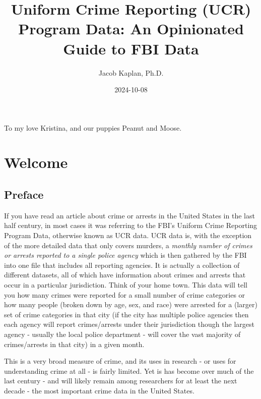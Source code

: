 \documentclass[
]{krantz}
\title{Uniform Crime Reporting (UCR) Program Data: An
Opinionated Guide to FBI Data}
\author{Jacob Kaplan, Ph.D.}
\date{2024-10-08}
\begin{document}
\maketitle

\thispagestyle{empty}
\begin{center}
To my love Kristina, and our puppies Peanut and Moose.
\end{center}

\setlength{\abovedisplayskip}{-5pt}
\setlength{\abovedisplayshortskip}{-5pt}

{
\hypersetup{linkcolor=}
\setcounter{tocdepth}{2}
\tableofcontents
}
\mainmatter

\part{Welcome}\label{part-welcome}

\chapter{Preface}\label{preface}

If you have read an article about crime or arrests in the
United States in the last half century, in most cases it was
referring to the FBI's Uniform Crime Reporting Program Data,
otherwise known as UCR data. UCR data is, with the exception
of the more detailed data that only covers murders, a
\emph{monthly number of crimes or arrests reported to a
single police agency} which is then gathered by the FBI into
one file that includes all reporting agencies. It is
actually a collection of different datasets, all of which
have information about crimes and arrests that occur in a
particular jurisdiction. Think of your home town. This data
will tell you how many crimes were reported for a small
number of crime categories or how many people (broken down
by age, sex, and race) were arrested for a (larger) set of
crime categories in that city (if the city has multiple
police agencies then each agency will report crimes/arrests
under their jurisdiction though the largest agency - usually
the local police department - will cover the vast majority
of crimes/arrests in that city) in a given month.

This is a very broad measure of crime, and its uses in
research - or uses for understanding crime at all - is
fairly limited. Yet is has become over much of the last
century - and will likely remain among researchers for at
least the next decade - the most important crime data in the
United States.
\end{document}
